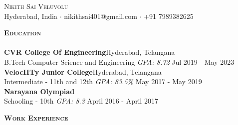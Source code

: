 \documentclass[a4paper]{article}
\newcommand{\lineunder} {
    \vspace*{-8pt} \\
    \hspace*{-18pt} \hrulefill \\
}
\newcommand{\header} [1] {
    {\hspace*{-18pt}\vspace*{6pt} \textbf{\textsc{#1}}}
    \vspace*{-6pt} \lineunder
}
\begin{document}
\vspace*{-40pt}

    

\vspace*{-10pt}
\begin{center}
	{\Huge \scshape {Nikith Sai Veluvolu}}\\
	Hyderabad, India $\cdot$ nikithsai401@gmail.com $\cdot$ +91 7989382625\\
\end{center}

\header{Education}
\textbf{CVR College Of Engineering}\hfill Hyderabad, Telangana\\
B.Tech Computer Science and Engineering \textit{GPA: 8.72} \hfill Jul 2019 - May 2023\\
\vspace{2mm}
\textbf{VelocIITy Junior College}\hfill Hyderabad, Telangana\\
Intermediate - 11th and 12th \textit{GPA: 83.5\%} \hfill May 2017 - May 2019\\
\vspace{2mm}
\textbf{Narayana Olympiad}\\
Schooling - 10th \textit{GPA: 8.3} \hfill April 2016 - April 2017\\
\vspace{2mm}

\header{Work Experience}
\vspace{1mm}
\end{document}
